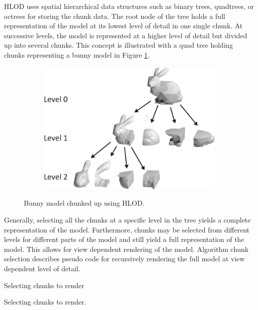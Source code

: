HLOD uses spatial hierarchical data structures such as binary trees, quadtrees, or octrees for storing the chunk data. The root node of the tree holds a full representation of the model at its lowest level of detail in one single chunk. At successive levels, the model is represented at a higher level of detail but divided up into several chunks. This concept is illustrated with a quad tree holding chunks representing a bunny model in Figure \ref{fig:hlod}.

\begin{figure}[htbp]
    \centering
    \begin{subfigure}[bt]{0.6\textwidth}
        \includegraphics[width=\textwidth]{figures/lod/hlod.pdf}
    \end{subfigure}
    \caption{Bunny model chunked up using HLOD.}
    \label{fig:hlod}
\end{figure}

Generally, selecting all the chunks at a specific level in the tree yields a complete representation of the model. Furthermore, chunks may be selected from different levels for different parts of the model and still yield a full representation of the model. This allows for view dependent rendering of the model. Algorithm chunk selection describes pseudo code for recursively rendering the full model at view dependent level of detail.

\begin{algorithm}[htp]
  \caption{Selecting chunks to render}
    \label{alg:chunkselection}
  \caption{Selecting chunks to render.}
\end{algorithm} 

